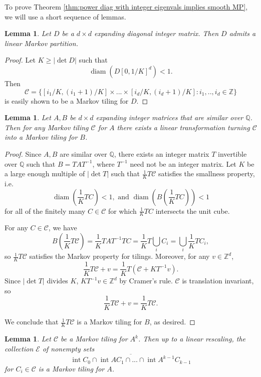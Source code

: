 \documentclass{article}
\def\Q{\mathbb{Q}}
\def\Z{\mathbb{Z}}
\newtheorem{lemma}[theorem]{Lemma}
\begin{document}
To prove Theorem \ref{thm:power diag with integer eigenvals implies smooth MP}, we will use a short sequence of lemmas.

\begin{lemma}\label{lem:MP for diagonal}
    Let $D$ be a $d\times d$ expanding diagonal integer matrix. Then $D$ admits a linear Markov partition.
\end{lemma}

\begin{proof}
    Let $K\geq |\det D|$ such that $$\operatorname{diam}(D[0,1/K]^d)<1.$$ Then $$\mathcal{C}=\{[i_1/K,(i_1+1)/K]\times ... \times [i_d/K,(i_d+1)/K]:i_1,..,i_d\in\Z\}$$
    is easily shown to be a Markov tiling for $D$. 
\end{proof}

\begin{lemma}\label{lem:MPforsimilarmatrices}
    Let $A,B$ be $d\times d$ expanding integer matrices that are similar over $\Q$. Then for any Markov tiling $\mathcal{C}$ for $A$ there exists a linear transformation turning $\mathcal{C}$ into a Markov tiling for $B$.
\end{lemma}

\begin{proof}
    Since $A,B$ are similar over $\Q$, there exists an integer matrix $T$ invertible over $\Q$ such that $B=TAT^{-1}$, where $T^{-1}$ need not be an integer matrix. Let $K$ be a large enough multiple of $|\det T|$ such that $\frac{1}{K}T\mathcal{C}$ satisfies the smallness property, i.e. $$\operatorname{diam}\left(\frac{1}{K}TC\right)<1,\text{ and }\operatorname{diam}\left(B\left(\frac{1}{K} TC\right)\right)<1$$ for all of the finitely many $C\in \mathcal{C}$ for which $\frac{1}{K}TC$ intersects the unit cube. 
    
    For any $C\in \mathcal{C}$, we have $$B\left(\frac{1}{K} T\mathcal{C}\right)=\frac{1}{K} TAT^{-1}TC=\frac{1}{K}T\bigcup_{i}C_i=\bigcup_i\frac{1}{K}TC_i,$$ so $\frac{1}{K}T\mathcal{C}$ satisfies the Markov property for tilings.
    Moreover, for any $v\in \Z^d$, $$\frac{1}{K}T\mathcal{C}+v=\frac{1}{K}T(\mathcal{C}+KT^{-1}v).$$
    Since $|\det T|$ divides $K$, $KT^{-1}v\in \Z^d$ by Cramer's rule. $\mathcal{C}$ is translation invariant, so $$\frac{1}{K}T\mathcal{C}+v=\frac{1}{K}T\mathcal{C}.$$

    We conclude that $\frac{1}{K}T\mathcal{C}$ is a Markov tiling for $B$, as desired. 
\end{proof}


\begin{lemma}\label{lem:MPforpowers}
    Let $\mathcal{C}$ be a Markov tiling for $A^k$. Then up to a linear rescaling, the collection $\mathcal{E}$ of nonempty sets $$\overline{\operatorname{int}C_0\cap \operatorname{int}AC_1\cap...\cap\operatorname{int}A^{k-1}C_{k-1}}$$ for $C_i\in\mathcal{C}$ is a Markov tiling for $A$. 
\end{lemma}
\end{document}
